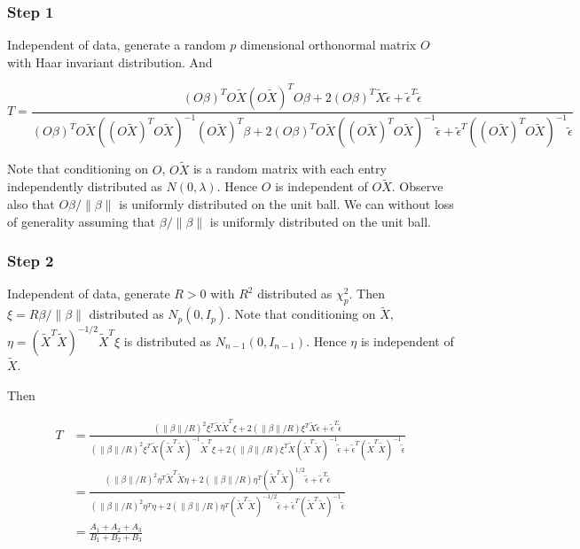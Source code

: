 \documentclass[review]{elsarticle}
\theoremstyle{plain}
\theoremstyle{definition}
\theoremstyle{remark}
\begin{document}
\subsubsection{Step 1}
Independent of data, generate a random $p$ dimensional orthonormal matrix $O$ with Haar invariant distribution. And 

\begin{equation}
    T=\frac{{(O\beta)}^T O\tilde{X}{(O\tilde{X})}^T O\beta+
        2{(O\beta)}^T \tilde{X}\tilde{\epsilon}+
        \tilde{\epsilon}^T\tilde{\epsilon}
    }{{(O\beta)}^T O\tilde{X}{({(O\tilde{X})}^T O\tilde{X})}^{-1}{(O\tilde{X})}^T \beta+
        2{(O\beta)}^T O\tilde{X}{({(O\tilde{X})}^T O\tilde{X})}^{-1}\tilde{\epsilon}+
        \tilde{\epsilon}^T{({(O\tilde{X})}^T O\tilde{X})}^{-1}\tilde{\epsilon}
    }
\end{equation}

Note that conditioning on $O$, $O\tilde{X}$ is a random matrix with each entry independently distributed as $N(0,\lambda)$. Hence $O$ is independent of $O\tilde{X}$. Observe also that $O\beta/\|\beta\|$ is uniformly distributed on the unit ball.  We can without loss of generality assuming that $\beta/\|\beta\|$ is uniformly distributed on the unit ball.

\subsubsection{Step 2}
Independent of data, generate $R>0$ with $R^2$ distributed as $\chi^2_{p}$. Then $\xi=R\beta/\|\beta\|$ distributed as $N_p(0,I_p)$.
Note that conditioning on $\tilde{X}$, $\eta={(\tilde{X}^T\tilde{X})}^{-1/2}\tilde{X}^T \xi$ is distributed as $N_{n-1}(0,I_{n-1})$. Hence $\eta$ is independent of $\tilde{X}$.

Then

\begin{equation}
    \begin{aligned}
        T&=\frac{{(\|\beta\|/R)}^2\xi^T \tilde{X}\tilde{X}^T \xi+
        2(\|\beta\|/R)\xi^T \tilde{X}\tilde{\epsilon}+
        \tilde{\epsilon}^T\tilde{\epsilon}
    }{{(\|\beta\|/R)}^2\xi^T \tilde{X}{(\tilde{X}^T\tilde{X})}^{-1}\tilde{X}^T \xi+
        2(\|\beta\|/R)\xi^T \tilde{X}{(\tilde{X}^T\tilde{X})}^{-1}\tilde{\epsilon}+
        \tilde{\epsilon}^T{(\tilde{X}^T\tilde{X})}^{-1}\tilde{\epsilon}
    }\\
        &=
        \frac{{(\|\beta\|/R)}^2\eta^T \tilde{X}^T\tilde{X} \eta+
        2(\|\beta\|/R)\eta^T {(\tilde{X}^T\tilde{X})}^{1/2}\tilde{\epsilon}+
        \tilde{\epsilon}^T\tilde{\epsilon}
    }{{(\|\beta\|/R)}^2\eta^T\eta+
        2(\|\beta\|/R)\eta^T{(\tilde{X}^T\tilde{X})}^{-1/2}\tilde{\epsilon}+
        \tilde{\epsilon}^T{(\tilde{X}^T\tilde{X})}^{-1}\tilde{\epsilon}
    }\\
        &=\frac{A_1+A_2+A_3}{B_1+B_2+B_3}
    \end{aligned}
\end{equation}
\end{document}
